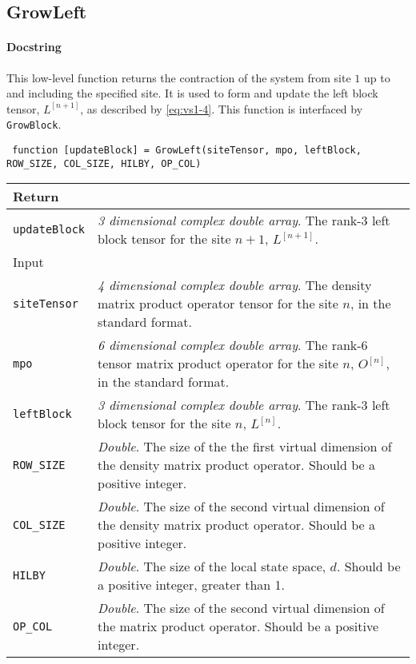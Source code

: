  \subsection{GrowLeft}
 \paragraph{Docstring} This low-level function returns the contraction of the system from site \(1\) up to and including the specified site. It is used to form and update the left block tensor, \(L^{[n+1]}\), as described by \cref{eq:vs1-4}. This function is interfaced by \lstinline$GrowBlock$.
 \begin{lstlisting}
 function [updateBlock] = GrowLeft(siteTensor, mpo, leftBlock, ROW_SIZE, COL_SIZE, HILBY, OP_COL) \end{lstlisting}
 \begin{longtabu}{X[1,l]X[4,l]}
 \hline
 Return & \\ \hline
 \lstinline$updateBlock$ & \emph{3 dimensional complex double array}. The rank-3 left block tensor for the site \(n + 1\), \(L^{[n+1]}\). \\ \hline
 Input & \\ \hline
 \lstinline$siteTensor$ & \emph{4 dimensional complex double array}. The density matrix product operator tensor for the site \(n\), in the standard format. \\
 \lstinline$mpo$ & \emph{6 dimensional complex double array}. The rank-6 tensor matrix product operator for the site \(n\), \(O^{[n]}\), in the standard format. \\
 \lstinline$leftBlock$ & \emph{3 dimensional complex double array}. The rank-3 left block tensor for the site \(n\), \(L^{[n]}\). \\
 \lstinline$ROW_SIZE$ & \emph{Double}. The size of the the first virtual dimension of the density matrix product operator. Should be a positive integer. \\
 \lstinline$COL_SIZE$ & \emph{Double}. The size of the second virtual dimension of the density matrix product operator. Should be a positive integer. \\ 
 \lstinline$HILBY$ & \emph{Double}. The size of the local state space, \(d\). Should be a positive integer, greater than 1. \\
 \lstinline$OP_COL$ & \emph{Double}. The size of the second virtual dimension of the matrix product operator. Should be a positive integer. \\
 \hline
 \end{longtabu}
